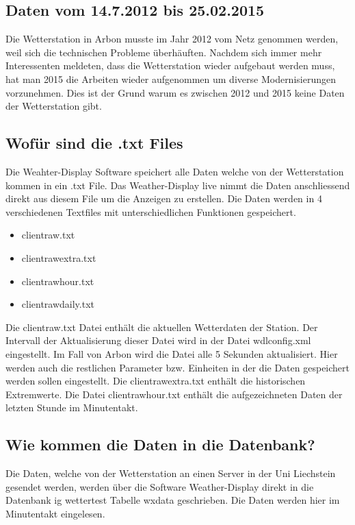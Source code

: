 \documentclass[a4paper,ngerman, 11pt]{report}
\begin{document}
\subsection{Daten vom 14.7.2012 bis 25.02.2015}
Die Wetterstation in Arbon musste im Jahr 2012 vom Netz genommen werden, weil sich die technischen Probleme überhäuften. Nachdem sich immer mehr Interessenten meldeten, dass die Wetterstation wieder aufgebaut werden muss, hat man 2015 die Arbeiten wieder aufgenommen um diverse Modernisierungen vorzunehmen. Dies ist der Grund warum es zwischen 2012 und 2015 keine Daten der Wetterstation gibt. ~\cite{Felix:ErweiterteHorizonte}

\subsection{Wofür sind die .txt Files}
Die Weahter-Display Software speichert alle Daten welche von der Wetterstation kommen in ein .txt File. Das Weather-Display live nimmt die Daten anschliessend direkt aus diesem File um die Anzeigen zu erstellen. Die Daten werden in 4 verschiedenen Textfiles mit unterschiedlichen Funktionen gespeichert.
\begin{itemize}  
\item clientraw.txt
\item clientrawextra.txt
\item clientrawhour.txt
\item clientrawdaily.txt
\end{itemize}

Die clientraw.txt Datei enthält die aktuellen Wetterdaten der Station. Der Intervall der Aktualisierung dieser Datei wird in der Datei wdlconfig.xml eingestellt. Im Fall von Arbon wird die Datei alle 5 Sekunden aktualisiert.  Hier werden auch die restlichen Parameter bzw. Einheiten in der die Daten gespeichert werden sollen eingestellt. Die clientrawextra.txt enthält die historischen Extremwerte. Die Datei clientrawhour.txt enthält die aufgezeichneten Daten der letzten Stunde im Minutentakt.\cite{WeatherDisplay}


\subsection{Wie kommen die Daten in die Datenbank?}
Die Daten, welche von der Wetterstation an einen Server in der Uni Liechstein gesendet werden, werden über die Software Weather-Display direkt in die Datenbank ig wettertest Tabelle wxdata geschrieben. Die Daten werden hier im Minutentakt eingelesen.
\end{document}
